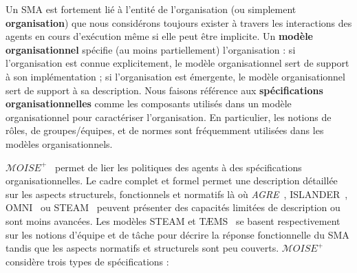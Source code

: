 \documentclass[contribution]{jfsma}
\begin{document}
Un SMA est fortement lié à l'entité de l'organisation (ou simplement \textbf{organisation}) que nous considérons toujours exister à travers les interactions des agents en cours d'exécution même si elle peut être implicite.
%
%
Un \textbf{modèle organisationnel} spécifie (au moins partiellement) l'organisation : si l'organisation est connue explicitement, le modèle organisationnel sert de support à son implémentation ; si l'organisation est émergente, le modèle organisationnel sert de support à sa description. Nous faisons référence aux \textbf{spécifications organisationnelles} comme les composants utilisés dans un modèle organisationnel pour caractériser l'organisation.
En particulier, les notions de rôles, de groupes/équipes, et de normes sont fréquemment utilisées dans les modèles organisationnels.

% 


$\mathcal{M}OISE^+$~\cite{Hubner2007} permet de lier les politiques des agents à des spécifications organisationnelles. %
Le cadre complet et formel permet une description détaillée sur les aspects structurels, fonctionnels et normatifs là où \emph{AGRE}~\cite{Ferber2004}, ISLANDER~\cite{Esteva2002}, OMNI~\cite{Dignum2005} ou STEAM~\cite{Tambe1999} peuvent présenter des capacités limitées de description ou sont moins avancées.
Les modèles STEAM et TÆMS~\cite{Vincent2000} se basent respectivement sur les notions d'équipe et de tâche pour décrire la réponse fonctionnelle du SMA tandis que les aspects normatifs et structurels sont peu couverts.
$\mathcal{M}OISE^+$ considère trois types de spécifications :
\end{document}
